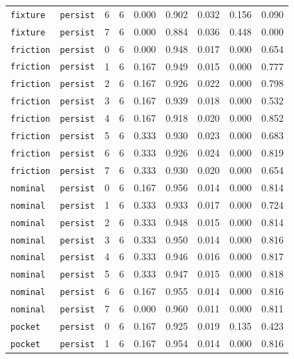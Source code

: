 \documentclass{article}
\begin{document}
\begin{center}
\begin{tabular}{lllcccccc}
\texttt{fixture} & \texttt{persist} & 6 & 6 & 0.000 & 0.902 & 0.032 & 0.156 & 0.090 \\
\texttt{fixture} & \texttt{persist} & 7 & 6 & 0.000 & 0.884 & 0.036 & 0.448 & 0.000 \\
\texttt{friction} & \texttt{persist} & 0 & 6 & 0.000 & 0.948 & 0.017 & 0.000 & 0.654 \\
\texttt{friction} & \texttt{persist} & 1 & 6 & 0.167 & 0.949 & 0.015 & 0.000 & 0.777 \\
\texttt{friction} & \texttt{persist} & 2 & 6 & 0.167 & 0.926 & 0.022 & 0.000 & 0.798 \\
\texttt{friction} & \texttt{persist} & 3 & 6 & 0.167 & 0.939 & 0.018 & 0.000 & 0.532 \\
\texttt{friction} & \texttt{persist} & 4 & 6 & 0.167 & 0.918 & 0.020 & 0.000 & 0.852 \\
\texttt{friction} & \texttt{persist} & 5 & 6 & 0.333 & 0.930 & 0.023 & 0.000 & 0.683 \\
\texttt{friction} & \texttt{persist} & 6 & 6 & 0.333 & 0.926 & 0.024 & 0.000 & 0.819 \\
\texttt{friction} & \texttt{persist} & 7 & 6 & 0.333 & 0.930 & 0.020 & 0.000 & 0.654 \\
\texttt{nominal} & \texttt{persist} & 0 & 6 & 0.167 & 0.956 & 0.014 & 0.000 & 0.814 \\
\texttt{nominal} & \texttt{persist} & 1 & 6 & 0.333 & 0.933 & 0.017 & 0.000 & 0.724 \\
\texttt{nominal} & \texttt{persist} & 2 & 6 & 0.333 & 0.948 & 0.015 & 0.000 & 0.814 \\
\texttt{nominal} & \texttt{persist} & 3 & 6 & 0.333 & 0.950 & 0.014 & 0.000 & 0.816 \\
\texttt{nominal} & \texttt{persist} & 4 & 6 & 0.333 & 0.946 & 0.016 & 0.000 & 0.817 \\
\texttt{nominal} & \texttt{persist} & 5 & 6 & 0.333 & 0.947 & 0.015 & 0.000 & 0.818 \\
\texttt{nominal} & \texttt{persist} & 6 & 6 & 0.167 & 0.955 & 0.014 & 0.000 & 0.816 \\
\texttt{nominal} & \texttt{persist} & 7 & 6 & 0.000 & 0.960 & 0.011 & 0.000 & 0.811 \\
\texttt{pocket} & \texttt{persist} & 0 & 6 & 0.167 & 0.925 & 0.019 & 0.135 & 0.423 \\
\texttt{pocket} & \texttt{persist} & 1 & 6 & 0.167 & 0.954 & 0.014 & 0.000 & 0.816 \\
\bottomrule
\end{tabular}
\end{center}
\end{document}
